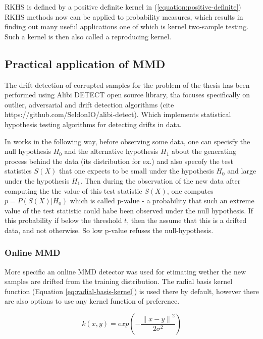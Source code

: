 RKHS is defined by a positive definite kernel in (\ref{equation:positive-definite})
RKHS methods now can be applied to probability measures, which results in finding out many useful applications one of which is kernel two-sample testing. Such a kernel is then also called a reproducing kernel. 

\subsection{Practical application of MMD}
The drift detection of corrupted samples for the problem of the thesis has been performed using Alibi DETECT open source library, tha focuses specifically on outlier, adversarial and drift detection algorithms (cite https://github.com/SeldonIO/alibi-detect). Which implements statistical hypothesis testing algorithms for detecting drifts in data. 

In works in the following way, before observing some data, one can specisfy the null hypothesis $H_0$ and the alternative hypothesis $H_1$ about the generating process behind the data (its distribution for ex.) and also specofy the test statistics $S(X)$ that one expects to be small under the hypothesis $H_0$ and large under the hypothesis $H_1$. Then during the observation of the new data after computing the the value of this test statistic $S(X)$, one computes $p = P(S(X)|H_0)$ which is called p-value - a probability that such an extreme value of the test statistic could habe been observed under the null hypothesis. If this probability if below the threshold $t$, then the assume that this is a drifted data, and not otherwise. So low p-value refuses the null-hypothesis. 


\subsubsection{Online MMD}


More specific an online MMD detector was used for etimating wether the new samples are drifted from the training distribution. The radial basis kernel function (Equation \ref{eq:radial-basis-kernel}) is used there by default, however there are also options to use any kernel function of preference.

\begin{equation}
    \label{eq:radial-basis-kernel}
    k(x, y) = exp\left(-\frac{{\lVert x - y \rVert}^2}{2\sigma^2}\right)
\end{equation}

